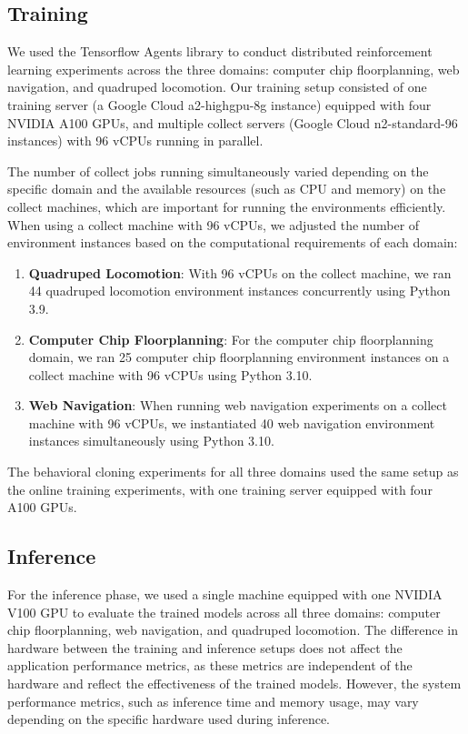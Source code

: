 \subsection{Training}
We used the Tensorflow Agents \cite{TFAgents} library to conduct distributed reinforcement learning experiments across the three domains: computer chip floorplanning, web navigation, and quadruped locomotion.
Our training setup consisted of one training server (a Google Cloud a2-highgpu-8g instance\protect\footnotemark[1]) equipped with four NVIDIA A100 GPUs, and multiple collect servers (Google Cloud n2-standard-96 instances\protect\footnotemark[2]) with 96 vCPUs running in parallel.


The number of collect jobs running simultaneously varied depending on the specific domain and the available resources (such as CPU and memory) on the collect machines, which are important for running the environments efficiently. When using a collect machine with 96 vCPUs, we adjusted the number of environment instances based on the computational requirements of each domain:

\begin{enumerate}
\item \textbf{Quadruped Locomotion}: With 96 vCPUs on the collect machine, we ran 44 quadruped locomotion environment instances concurrently using Python 3.9.
\item \textbf{Computer Chip Floorplanning}: For the computer chip floorplanning domain, we ran 25 computer chip floorplanning environment instances on a collect machine with 96 vCPUs using Python 3.10.
\item \textbf{Web Navigation}: When running web navigation experiments on a collect machine with 96 vCPUs, we instantiated 40 web navigation environment instances simultaneously using Python 3.10.
\end{enumerate}

The behavioral cloning experiments for all three domains used the same setup as the online training experiments, with one training server equipped with four A100 GPUs.

\subsection{Inference}
For the inference phase, we used a single machine equipped with one NVIDIA V100 GPU to evaluate the trained models across all three domains: computer chip floorplanning, web navigation, and quadruped locomotion. The difference in hardware between the training and inference setups does not affect the application performance metrics, as these metrics are independent of the hardware and reflect the effectiveness of the trained models. However, the system performance metrics, such as inference time and memory usage, may vary depending on the specific hardware used during inference.